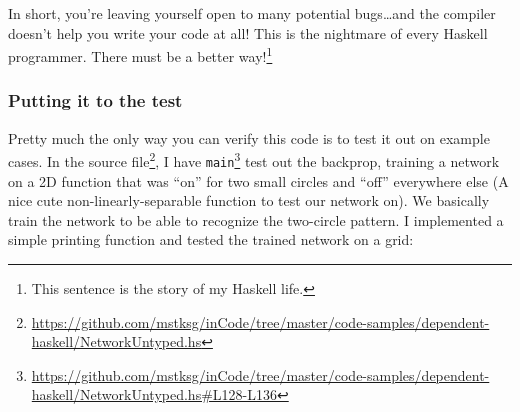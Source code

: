 \documentclass[]{article}
\newenvironment{Shaded}{}{}
\newcommand{\CommentTok}[1]{\textcolor[rgb]{0.38,0.63,0.69}{\textit{#1}}}
\newcommand{\ExtensionTok}[1]{#1}
\newcommand{\NormalTok}[1]{#1}
\renewcommand{\href}[2]{#2\footnote{\url{#1}}}
\begin{document}
In short, you're leaving yourself open to many potential bugs\ldots and the
compiler doesn't help you write your code at all! This is the nightmare of every
Haskell programmer. There must be a better way!\footnote{This sentence is the
  story of my Haskell life.}

\hypertarget{putting-it-to-the-test}{%
\subsubsection{Putting it to the test}\label{putting-it-to-the-test}}

Pretty much the only way you can verify this code is to test it out on example
cases. In the
\href{https://github.com/mstksg/inCode/tree/master/code-samples/dependent-haskell/NetworkUntyped.hs}{source
file}, I have
\href{https://github.com/mstksg/inCode/tree/master/code-samples/dependent-haskell/NetworkUntyped.hs\#L128-L136}{\texttt{main}}
test out the backprop, training a network on a 2D function that was ``on'' for
two small circles and ``off'' everywhere else (A nice cute
non-linearly-separable function to test our network on). We basically train the
network to be able to recognize the two-circle pattern. I implemented a simple
printing function and tested the trained network on a grid:

\begin{Shaded}
\end{Shaded}
\end{document}
